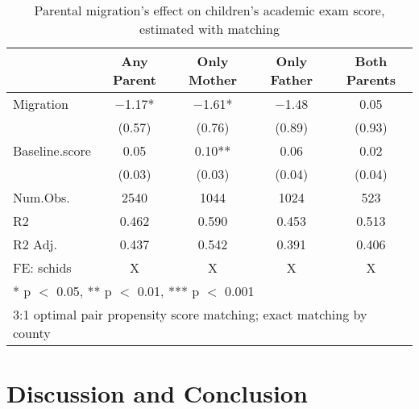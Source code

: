 \documentclass[
  man,floatsintext]{apa7}
\begin{document}
\newpage

\begin{table}

\caption{Parental migration’s effect on children’s academic exam score, estimated with matching}
\centering
\begin{tabular}[t]{lcccc}
\toprule
  & Any Parent & Only Mother & Only Father & Both Parents\\
\midrule
Migration & \num{-1.17}* & \num{-1.61}* & \num{-1.48} & \num{0.05}\\
 & (\num{0.57}) & (\num{0.76}) & (\num{0.89}) & (\num{0.93})\\
Baseline.score & \num{0.05} & \num{0.10}** & \num{0.06} & \num{0.02}\\
 & (\num{0.03}) & (\num{0.03}) & (\num{0.04}) & (\num{0.04})\\
\midrule
Num.Obs. & \num{2540} & \num{1044} & \num{1024} & \num{523}\\
R2 & \num{0.462} & \num{0.590} & \num{0.453} & \num{0.513}\\
R2 Adj. & \num{0.437} & \num{0.542} & \num{0.391} & \num{0.406}\\
FE: schids & X & X & X & X\\
\bottomrule
\multicolumn{5}{l}{\rule{0pt}{1em}* p $<$ 0.05, ** p $<$ 0.01, *** p $<$ 0.001}\\
\multicolumn{5}{l}{\rule{0pt}{1em}3:1 optimal pair propensity score matching; exact matching by county}\\
\end{tabular}
\end{table}

\newpage

\hypertarget{discussion-and-conclusion}{%
\section{Discussion and Conclusion}\label{discussion-and-conclusion}}
\end{document}
